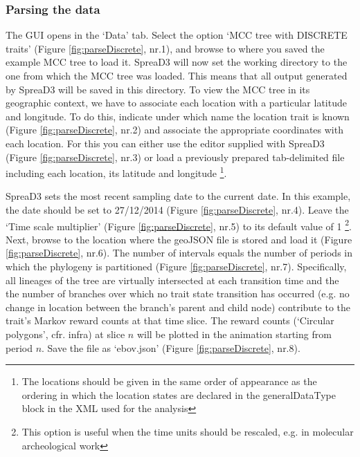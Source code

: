 \documentclass[english]{paper}
\begin{document}
\subsubsection{Parsing the data}
The GUI opens in the `Data' tab.
Select the option `MCC tree with DISCRETE traits' (Figure \ref{fig:parseDiscrete}, nr.1), and browse to where you saved the example MCC tree to load it.
SpreaD3 will now set the working directory to the one from which the MCC tree was loaded. 
This means that all output generated by SpreaD3 will be saved in this directory.
To view the MCC tree in its geographic context, we have to associate each location with a particular latitude and longitude. 
To do this, indicate under which name the location trait is known (Figure \ref{fig:parseDiscrete}, nr.2) and associate the appropriate coordinates with each location.
For this you can either use the editor supplied with SpreaD3 (Figure \ref{fig:parseDiscrete}, nr.3) or load a previously prepared tab-delimited file including each location, its latitude and longitude \footnote{The locations should be given in the same order of appearance as the ordering in which the location states are declared in the generalDataType block in the XML used for the analysis}. 
\par
SpreaD3 sets the most recent sampling date to the current date. 
In this example, the date should be set to 27/12/2014 (Figure \ref{fig:parseDiscrete}, nr.4).
Leave the `Time scale multiplier' (Figure \ref{fig:parseDiscrete}, nr.5) to its default value of 1 \footnote{This option is useful when the time units should be rescaled,  e.g. in molecular archeological work}. 
Next, browse to the location where the geoJSON file is stored and load it (Figure \ref{fig:parseDiscrete}, nr.6).
The number of intervals equals the number of periods in which the phylogeny is partitioned (Figure \ref{fig:parseDiscrete}, nr.7). %
Specifically, all lineages of the tree are virtually intersected at each transition time and the the number of branches over which no trait state transition has occurred (e.g. no change in location between the branch's parent and child node) contribute to the trait's Markov reward counts at that time slice.
The reward counts (`Circular polygons', cfr. infra) at slice $n$ will be plotted in the animation starting from period $n$.
Save the file as `ebov.json' (Figure \ref{fig:parseDiscrete}, nr.8).
\end{document}
